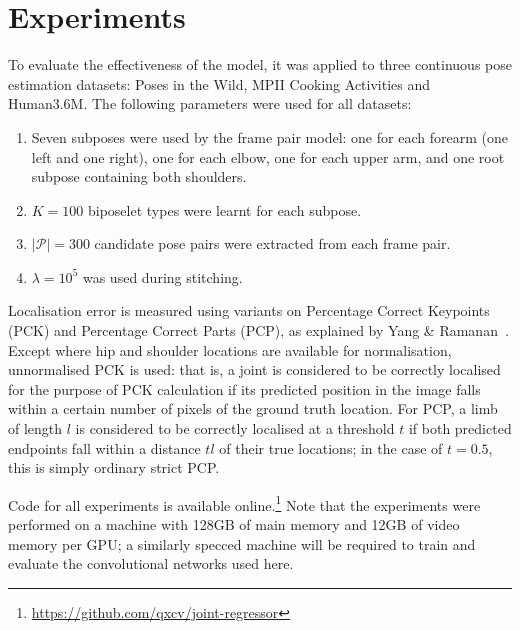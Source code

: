 \documentclass[runningheads]{llncs}
\begin{document}
\section{Experiments}\label{sec:experiments}


To evaluate the effectiveness of the model, it was applied to three continuous
pose estimation datasets: Poses in the Wild, MPII Cooking Activities and
Human3.6M. The following parameters were used for all datasets:

\begin{enumerate}
\item Seven subposes were used by the frame pair model: one for each forearm
(one left and one right), one for each elbow, one for each upper arm, and one
root subpose containing both shoulders.
\item $K = 100$ biposelet types were learnt for each subpose.
\item $|\mathcal P| = 300$ candidate pose pairs were extracted from each frame
pair.
\item $\lambda = 10^5$ was used during stitching.
\end{enumerate}

Localisation error is measured using variants on Percentage Correct Keypoints
(PCK) and Percentage Correct Parts (PCP), as explained by Yang \&
Ramanan~\cite{yang2013articulated}. Except where hip and shoulder locations are
available for normalisation, unnormalised PCK is used: that is, a joint is
considered to be correctly localised for the purpose of PCK calculation if its
predicted position in the image falls within a certain number of pixels of the
ground truth location. For PCP, a limb of length $l$ is considered to be
correctly localised at a threshold $t$ if both predicted endpoints fall within a
distance $tl$ of their true locations; in the case of $t = 0.5$, this is simply
ordinary strict PCP.

Code for all experiments is available
online.\footnote{\url{https://github.com/qxcv/joint-regressor}} Note that the
experiments were performed on a machine with 128GB of main memory and 12GB of
video memory per GPU; a similarly specced machine will be required to train and
evaluate the convolutional networks used here.
\end{document}
